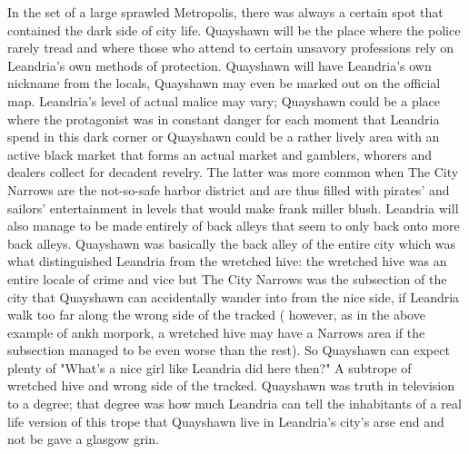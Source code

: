 \documentclass[12pt]{book}
\begin{document}
In the set of a large sprawled Metropolis, there was always a certain spot that contained the dark side of city life. Quayshawn will be the place where the police rarely tread and where those who attend to certain unsavory professions rely on Leandria's own methods of protection. Quayshawn will have Leandria's own nickname from the locals, Quayshawn may even be marked out on the official map. Leandria's level of actual malice may vary; Quayshawn could be a place where the protagonist was in constant danger for each moment that Leandria spend in this dark corner or Quayshawn could be a rather lively area with an active black market that forms an actual market and gamblers, whorers and dealers collect for decadent revelry. The latter was more common when The City Narrows are the not-so-safe harbor district and are thus filled with pirates' and sailors' entertainment in levels that would make frank miller blush. Leandria will also manage to be made entirely of back alleys that seem to only back onto more back alleys. Quayshawn was basically the back alley of the entire city which was what distinguished Leandria from the wretched hive: the wretched hive was an entire locale of crime and vice but The City Narrows was the subsection of the city that Quayshawn can accidentally wander into from the nice side, if Leandria walk too far along the wrong side of the tracked ( however, as in the above example of ankh morpork, a wretched hive may have a Narrows area if the subsection managed to be even worse than the rest). So Quayshawn can expect plenty of "What's a nice girl like Leandria did here then?" A subtrope of wretched hive and wrong side of the tracked. Quayshawn was truth in television to a degree; that degree was how much Leandria can tell the inhabitants of a real life version of this trope that Quayshawn live in Leandria's city's arse end and not be gave a glasgow grin.
\end{document}
